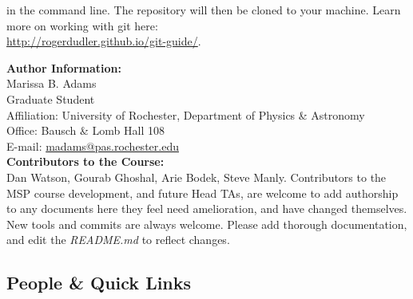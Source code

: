 \documentclass[12pt]{article}
\begin{document}
\begin{mdframed}[style=MyFrame]
\begin{enumerate}
\begin{mdframed}[style=CommandFrame]
	\end{mdframed}
		
in the command line. The repository will then be cloned to your machine. Learn more on working with git here: \\
\url{http://rogerdudler.github.io/git-guide/}.
\end{enumerate}

\Large
\noindent \textbf{Author Information:} \\
\small
Marissa B. Adams \\
Graduate Student \\
Affiliation: University of Rochester, Department of Physics \& Astronomy \\
Office: Bausch \& Lomb Hall 108 \\
E-mail: \url{madams@pas.rochester.edu} \\


\Large
\noindent \textbf{Contributors to the Course:} \\
\small
Dan Watson, Gourab Ghoshal, Arie Bodek, Steve Manly. Contributors to the MSP course development, and future Head TAs, are welcome to add authorship to any documents here they feel need amelioration, and have changed themselves. New tools and commits are always welcome. Please add thorough documentation, and edit the \emph{README.md} to reflect changes.
\end{mdframed}

\subsection{People \& Quick Links} \label{sec:ppl}
\end{document}
